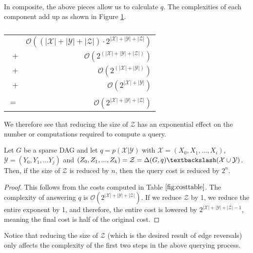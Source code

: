 \begin{myindentpar}{1.5em}
 \null \quad \quad In composite, the above pieces allow us to calculate $q$. The complexities of each component add up as shown in Figure \ref{fig:costtable}.
 \begin{center}
 \begin{table}[h!]
 \centering
 \begin{tabular}{r r}
 \   & $\mathcal{O}((|\mathcal{X}|+|\mathcal{Y}|+ |\mathcal{Z}|)\cdot 2^{|\mathcal{X}|+|\mathcal{Y}|+|\mathcal{Z}|})$ \\[1em]
$+$ & $\mathcal{O}(2^{(|\mathcal{X}|+|\mathcal{Y}| + |\mathcal{Z}|)})$ \\[1em]
$+$ & $\mathcal{O}(2^{(|\mathcal{X}| + |\mathcal{Y}|)})$ \\[1em]
$+$ & $\mathcal{O}(2^{|\mathcal{X}| + |\mathcal{Y}|})$ \\[1em]
 \hline \\[-1em]
$=$ & $\mathcal{O}(2^{|\mathcal{X}|+|\mathcal{Y}|+|\mathcal{Z}|})$ \\[1em]
 \end{tabular}
 \caption{}
 \label{fig:costtable}
 \end{table}
 \end{center}
\end{myindentpar}
We therefore see that reducing the size of $\mathcal{Z}$ has an exponential effect on the number or computations required to compute a query. 

\begin{theorem}
Let $G$ be a sparse DAG and let $q = p(\mathcal{X}|\mathcal{Y})$ with $\mathcal{X} = (X_{0},X_{1},...,X_{i})$, $\mathcal{Y} = (Y_{0},Y_{1},...Y_{j})$ and $(Z_{0},Z_{1},...,Z_{k}) = \mathcal{Z} = \Delta(G,q) \textbackslash (\mathcal{X} \cup \mathcal{Y})$. Then, if the size of $\mathcal{Z}$ is reduced by $n$, then the query cost is reduced by $2^{n}$.
\end{theorem}

\begin{proof}
This follows from the costs computed in Table$~\ref{fig:costtable}$. The complexity of answering $q$ is $\mathcal{O}(2^{|\mathcal{X}|+|\mathcal{Y}|+|\mathcal{Z}|})$. If we reduce $\mathcal{Z}$ by 1, we reduce the entire exponent by 1, and therefore, the entire cost is lowered by $2^{|\mathcal{X}|+|\mathcal{Y}|+|\mathcal{Z}|-1}$, meaning the final cost is half of the original cost. 
\end{proof}


\begin{remark}
Notice that reducing the size of $\mathcal{Z}$ (which is the desired result of edge reversals) only affects the complexity of the first two steps in the above querying process. 
\end{remark}

